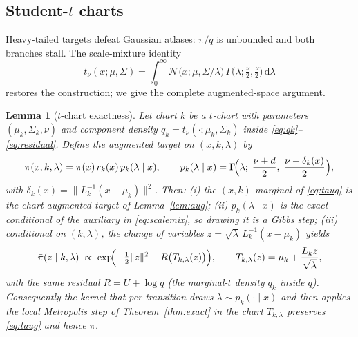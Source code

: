 \documentclass[11pt]{article}
\newtheorem{lemma}{Lemma}
\theoremstyle{remark}
\newcommand{\dd}{\mathrm{d}}
\begin{document}
\subsection{Student-$t$ charts}\label{sec:tcharts}
Heavy-tailed targets defeat Gaussian atlases: $\pi/q$ is unbounded and
both branches stall. The scale-mixture identity
\begin{equation}
t_\nu(x;\mu,\Sigma)=\int_0^\infty
\mathcal N\!\bigl(x;\mu,\Sigma/\lambda\bigr)\,
\Gamma\!\bigl(\lambda;\tfrac\nu2,\tfrac\nu2\bigr)\,\dd\lambda
\label{eq:scalemix}
\end{equation}
restores the construction; we give the complete augmented-space argument.

\begin{lemma}[$t$-chart exactness]\label{lem:tchart}
Let chart $k$ be a $t$-chart with parameters $(\mu_k,\Sigma_k,\nu)$ and
component density $q_k=t_\nu(\cdot;\mu_k,\Sigma_k)$ inside
\eqref{eq:qk}--\eqref{eq:residual}. Define the augmented target on
$(x,k,\lambda)$ by
\begin{equation}
\bar\pi(x,k,\lambda)
=\pi(x)\,r_k(x)\,p_k(\lambda\mid x),
\qquad
p_k(\lambda\mid x)
=\Gamma\!\Bigl(\lambda;\;\frac{\nu+d}{2},\;
\frac{\nu+\delta_k(x)}{2}\Bigr),
\label{eq:taug}
\end{equation}
with $\delta_k(x)=\lVert L_k^{-1}(x-\mu_k)\rVert^2$. Then:
(i) the $(x,k)$-marginal of \eqref{eq:taug} is the chart-augmented target
of Lemma~\ref{lem:aug}; (ii) $p_k(\lambda\mid x)$ is the exact
conditional of the auxiliary in \eqref{eq:scalemix}, so drawing it is a
Gibbs step; (iii) conditional on $(k,\lambda)$, the change of variables
$z=\sqrt\lambda\,L_k^{-1}(x-\mu_k)$ yields
\begin{equation}
\bar\pi(z\mid k,\lambda)\;\propto\;
\exp\!\Bigl(-\tfrac12\lVert z\rVert^2
-R\bigl(T_{k,\lambda}(z)\bigr)\Bigr),
\qquad
T_{k,\lambda}(z)=\mu_k+\frac{L_kz}{\sqrt\lambda},
\label{eq:tlatent}
\end{equation}
with the same residual $R=U+\log q$ (the marginal-$t$ density $q_k$
inside $q$). Consequently the kernel that per transition draws
$\lambda\sim p_k(\cdot\mid x)$ and then applies the local Metropolis step
of Theorem~\ref{thm:exact} in the chart $T_{k,\lambda}$ preserves
\eqref{eq:taug} and hence $\pi$.
\end{lemma}
\end{document}
